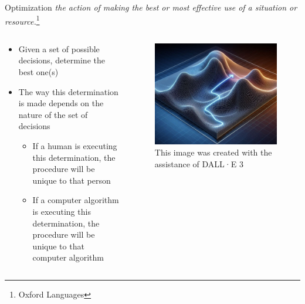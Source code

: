 \documentclass[10pt, aspectratio=169]{beamer}
\begin{document}
\begin{frame}[t]{Optimization}
    \textit{the action of making the best or most effective use of a situation or resource.}\footnote{Oxford Languages}
    \vspace{0.5cm}
    \begin{columns}[t]
        \begin{column}[t]{0.5\textwidth}
            \begin{itemize}
                \item Given a set of possible decisions, determine the best one(s)
                \item The way this determination is made depends on the nature of the set of decisions
                \begin{itemize}
                    \item If a human is executing this determination, the procedure will be unique to that person
                    \item If a computer algorithm is executing this determination, the procedure will be unique to that computer algorithm
                \end{itemize}
            \end{itemize}
        \end{column}
        \begin{column}[t]{0.5\textwidth}
            \begin{figure}
                \includegraphics[width=0.8\linewidth]{Mountain.jpeg}
                \caption{This image was created with the assistance of DALL·E 3}
            \end{figure}
        \end{column}
    \end{columns}
\end{frame}
\end{document}
